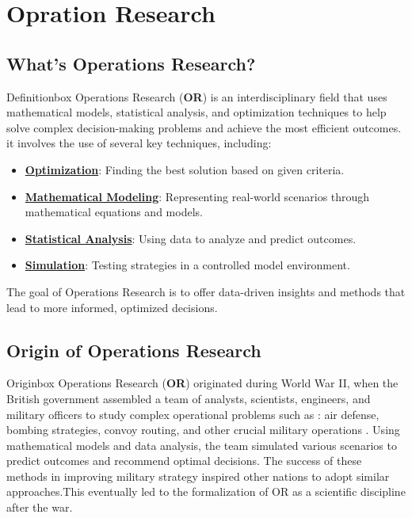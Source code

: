 \section{Opration Research}
\subsection{What's Operations Research?}
\begin{prettyBox}{Definition}{box}
Operations Research (\textbf{OR}) is an interdisciplinary field that uses mathematical models, statistical analysis, 
and optimization techniques to help solve complex decision-making problems and achieve the most efficient outcomes.
\noindent it involves the use of several key techniques, including:

\begin{itemize}
    \item \textbf{\underline{Optimization}}: Finding the best solution based on given criteria.
    \item \textbf{\underline{Mathematical Modeling}}: Representing real-world scenarios through mathematical equations and models.
    \item \textbf{\underline{Statistical Analysis}}: Using data to analyze and predict outcomes.
    \item \textbf{\underline{Simulation}}: Testing strategies in a controlled model environment.
\end{itemize}
The goal of Operations Research is to offer data-driven insights and methods that lead to more informed, optimized decisions.
\end{prettyBox}

\subsection{Origin of Operations Research}

\begin{prettyBox}{Origin}{box}
Operations Research (\textbf{OR}) originated during World War II, when the British government assembled a team of analysts, 
scientists, engineers, and military officers to study complex operational problems such as : air defense, bombing strategies, 
convoy routing, and other crucial military operations . Using mathematical models and data analysis, the team simulated various scenarios 
to predict outcomes and recommend optimal decisions. The success of these methods in improving military strategy inspired 
other nations to adopt similar approaches.This eventually led to the formalization of OR as a scientific discipline after the war.
\end{prettyBox}

